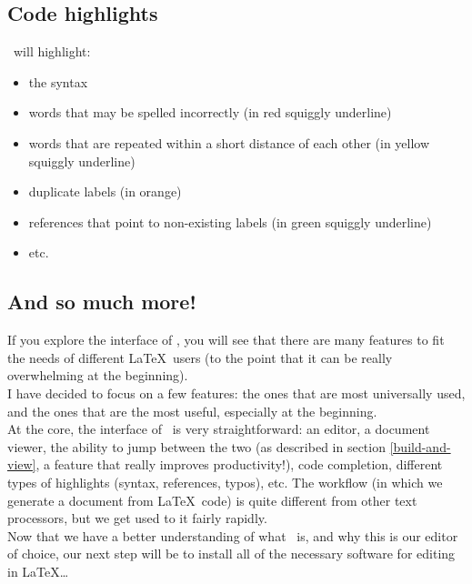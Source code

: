 \bigskip

\subsection{Code highlights}

\TeXstudio\ will highlight:
\begin{itemize}
	\item the syntax
	\item words that may be spelled incorrectly (in red squiggly underline)
	\item words that are repeated within a short distance of each other (in yellow squiggly underline)
	\item duplicate labels (in orange)
	\item references that point to non-existing labels (in green squiggly underline)
	\item etc.
\end{itemize}


\subsection{And so much more!}

If you explore the interface of \TeXstudio, you will see that there are many features to fit the needs of different \LaTeX\ users (to the point that it can be really overwhelming at the beginning). \\

I have decided to focus on a few features: the ones that are most universally used, and the ones that are the most useful, especially at the beginning. %
\\

At the core, the interface of \TeXstudio\ is very straightforward: an editor, a document viewer, the ability to jump between the two (as described in section \ref{build-and-view}, a feature that really improves productivity!), code completion, different types of highlights (syntax, references, typos), etc. The workflow (in which we generate a document from \LaTeX\ code) is quite different from other text processors, but we get used to it fairly rapidly. \\

Now that we have a better understanding of what \TeXstudio\ is, and why this is our editor of choice, our next step will be to install all of the necessary software for editing in \LaTeX\dots

